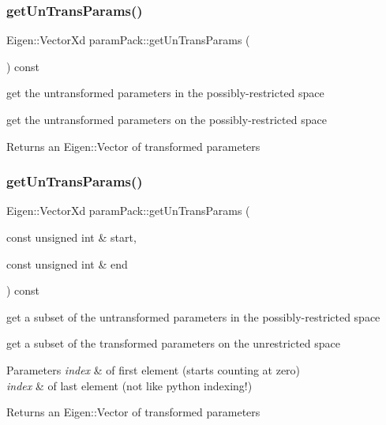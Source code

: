 \subsubsection{\texorpdfstring{get\+Un\+Trans\+Params()}{getUnTransParams()}\hspace{0.1cm}{\footnotesize\ttfamily [1/2]}}
{\footnotesize\ttfamily Eigen\+::\+Vector\+Xd param\+Pack\+::get\+Un\+Trans\+Params (\begin{DoxyParamCaption}{ }\end{DoxyParamCaption}) const}



get the untransformed parameters in the possibly-\/restricted space 

get the untransformed parameters on the possibly-\/restricted space \begin{DoxyReturn}{Returns}
an Eigen\+::\+Vector of transformed parameters 
\end{DoxyReturn}
\mbox{\label{classparamPack_a0a2a21e73e3c8371e91db1b056317c46}} 
\subsubsection{\texorpdfstring{get\+Un\+Trans\+Params()}{getUnTransParams()}\hspace{0.1cm}{\footnotesize\ttfamily [2/2]}}
{\footnotesize\ttfamily Eigen\+::\+Vector\+Xd param\+Pack\+::get\+Un\+Trans\+Params (\begin{DoxyParamCaption}\item[{const unsigned int \&}]{start,  }\item[{const unsigned int \&}]{end }\end{DoxyParamCaption}) const}



get a subset of the untransformed parameters in the possibly-\/restricted space 

get a subset of the transformed parameters on the unrestricted space 
\begin{DoxyParams}{Parameters}
{\em index} & of first element (starts counting at zero) \\
\hline
{\em index} & of last element (not like python indexing!) \\
\hline
\end{DoxyParams}
\begin{DoxyReturn}{Returns}
an Eigen\+::\+Vector of transformed parameters 
\end{DoxyReturn}
\mbox{\label{classparamPack_ac179e7541c993e05e5e435d5f20c558a}} 

